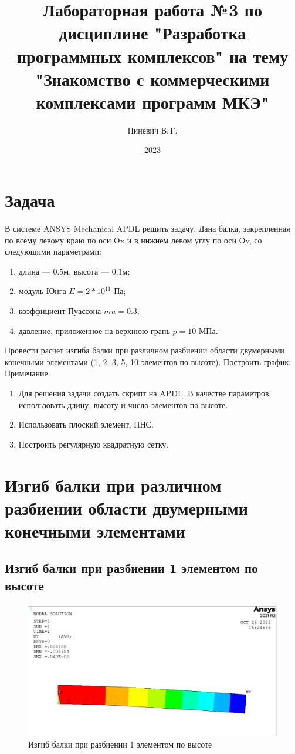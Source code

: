 \documentclass[12pt,a4paper]{article}
\title{Лабораторная работа №3 по дисциплине "Разработка программных комплексов" на тему "Знакомство с коммерческими комплексами программ МКЭ"}
\author{Пиневич В.\,Г.}
\date{2023}
\begin{document}
    \maketitle
    \tableofcontents
    \pagebreak

    \section{Задача}

    В системе ANSYS Mechanical APDL решить задачу.
    Дана балка, закрепленная по всему левому краю по оси Ox и в нижнем левом углу по оси Oy, со следующими параметрами:
    \begin{enumerate}
        \item длина — $0.5$м, высота — $0.1$м;
        \item модуль Юнга $E = 2*10^11$ Па;
        \item коэффициент Пуассона $ mu = 0.3$;
        \item давление, приложенное на верхнюю грань $p = 10$ МПа.
    \end{enumerate}
Провести расчет изгиба балки при различном разбиении области двумерными
конечными элементами (1, 2, 3, 5, 10 элементов по высоте). Построить график.
Примечание.
\begin{enumerate}
	\item Для решения задачи создать скрипт на APDL. В качестве параметров
	использовать длину, высоту и число элементов по высоте.
	\item Использовать плоский элемент, ПНС.
	\item Построить регулярную квадратную сетку.
\end{enumerate}

    \pagebreak

\section {Изгиб балки при различном разбиении области двумерными конечными элементами}

    \subsection{ Изгиб балки при разбиении 1 элементом по высоте }
    
    \begin{figure}[h]
    	\centering
    	\includegraphics[width=1\textwidth]{p1.PNG}
    	\caption{Изгиб балки при разбиении 1 элементом по высоте}
    \end{figure}
    
\end{document}
